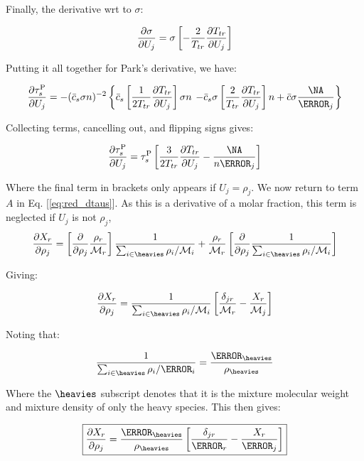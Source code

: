 \documentclass[10pt]{article}
\begin{document}
\begin{flushleft}
Finally, the derivative wrt to $\sigma$:

\begin{equation}
    \frac{\partial \sigma}{\partial U_j} = \sigma \left[ -\frac{2}{T_{tr}} \frac{\partial T_{tr}}{\partial U_j} \right]
\end{equation}

Putting it all together for Park's derivative, we have:

\begin{equation}
    \pd{\tau_s^\text{P}}{U_j} = - (\bar{c}_s \sigma n)^{-2} \left\{ \bar{c}_s \bb{\frac{1}{2 T_{tr}} \pd{T_{tr}}{U_j}} \sigma n \right.
    \left. - \bar{c}_s \sigma \bb{\frac{2}{T_{tr}} \pd{T_{tr}}{U_j}} n + \bar{c} \sigma \frac{\NA}{\MW_j} \right\}
\end{equation}

Collecting terms, cancelling out, and flipping signs gives:

\begin{equation}
    \pd{\tau_s^\text{P}}{U_j} = \tau_s^\text{P} \bb{\frac{3}{2 T_{tr}} \pd{T_{tr}}{U_j} - \frac{\NA}{n \MW_j}}
\end{equation}

Where the final term in brackets only appears if $U_j = \rho_j$. We now return to term $A$ in Eq. [\ref{eq:red_dtaus}]. As this is a derivative of a molar fraction, this term is neglected if $U_j$ is not $\rho_j$,
\begin{equation}
    \pd{X_r}{\rho_j} = \bb{\pd{}{\rho_j} \frac{\rho_r}{\mathcal{M}_r}} \frac{1}{\sum_{i \in \heavies} \rho_i / \mathcal{M}_i} + \frac{\rho_r}{\mathcal{M}_r} \bb{\pd{}{\rho_j} \frac{1}{\sum_{i \in \heavies} \rho_i / \mathcal{M}_i}}
\end{equation}

Giving:

\begin{equation}
    \pd{X_r}{\rho_j} = \frac{1}{\sum_{i \in \heavies} \rho_i / \mathcal{M}_i} \bb{\frac{\delta_{jr}}{\mathcal{M}_r} - \frac{X_r}{\mathcal{M}_j}}
\end{equation}

Noting that:

\begin{equation}
    \frac{1}{\sum_{i \in \heavies} \rho_i / \MW_i} = \frac{\MW_{\heavies}}{\rho_{\heavies}}
\end{equation}

Where the $\heavies$ subscript denotes that it is the mixture molecular weight and mixture density of only the heavy species. This then gives:

\begin{equation}
    \boxed{\pd{X_r}{\rho_j} = \frac{\MW_{\heavies}}{\rho_{\heavies}} \bb{\frac{\delta_{jr}}{\MW_r} - \frac{X_r}{\MW_j}}}
\end{equation}


\end{flushleft}
\end{document}
